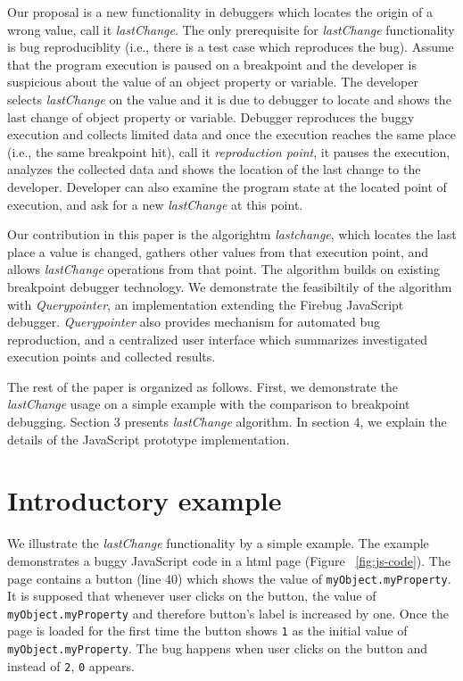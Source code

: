 \documentclass[preprint]{sigplanconf}
\begin{document}
Our proposal is a new functionality in debuggers which locates the origin of a wrong value, call it \textit{lastChange}. The only prerequisite for \textit{lastChange} functionality is bug reproduciblity (i.e., there is a test case which reproduces the bug). Assume that the program execution is paused on a breakpoint and the developer is suspicious about the value of an object property or variable. The developer selects \textit{lastChange} on the value and it is due to debugger to locate and shows the last change of object property or variable. Debugger reproduces the buggy execution and collects limited data and once the execution reaches the same place (i.e., the same breakpoint hit), call it \textit{reproduction point}, it pauses the execution, analyzes the collected data and shows the location of the last change to the developer. Developer can also examine the program state at the located point of execution, and ask for a new \textit{lastChange} at this point.

Our contribution in this paper is the algorightm \textit{lastchange}, which locates the last place a value is changed, gathers other values from that execution point, and allows \textit{lastChange} operations from that point. The algorithm builds on existing breakpoint debugger technology. We demonstrate the feasibiltily of the algorithm with \textit{Querypointer}, an implementation extending the Firebug JavaScript debugger. \textit{Querypointer} also provides mechanism for automated bug reproduction, and a centralized user interface which summarizes investigated execution points and collected results. 

The rest of the paper is organized as follows. First, we demonstrate the \textit{lastChange} usage on a simple example with the comparison to breakpoint debugging. Section 3 presents \textit{lastChange} algorithm. In section 4, we explain the details of the JavaScript prototype implementation. 

\section{Introductory example}
We illustrate the \textit{lastChange} functionality by a simple example. The example demonstrates a buggy JavaScript code in a html page (Figure ~\ref{fig:js-code}). The page contains a button (line 40) which shows the value of \texttt{myObject.myProperty}. It is supposed that whenever user clicks on the button, the value of \texttt{myObject.myProperty} and therefore button's label is increased by one. Once the page is loaded for the first time the button shows \texttt{1} as the initial value of \texttt{myObject.myProperty}. The bug happens when user clicks on the button and instead of \texttt{2}, \texttt{0} appears. 
\end{document}
